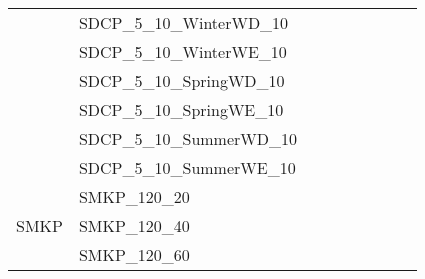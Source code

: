 \begin{table}[]
{\begin{tabular}{|c|l|l|l|l|l|l|l|l|}
			& SDCP\_5\_10\_WinterWD\_10     &                                    &                                  &                            &                          &                                         &                                 &                                \\
			& SDCP\_5\_10\_WinterWE\_10     &                                    &                                  &                            &                          &                                         &                                 &                                \\
			& SDCP\_5\_10\_SpringWD\_10     &                                    &                                  &                            &                          &                                         &                                 &                                \\
			& SDCP\_5\_10\_SpringWE\_10     &                                    &                                  &                            &                          &                                         &                                 &                                \\
			& SDCP\_5\_10\_SummerWD\_10     &                                    &                                  &                            &                          &                                         &                                 &                                \\
			& SDCP\_5\_10\_SummerWE\_10     &                                    &                                  &                            &                          &                                         &                                 &                                \\ \hline
			\multirow{5}{*}{SMKP}    & SMKP\_120\_20                 &                                    &                                  &                            &                          &                                         &                                 &                                \\
			& SMKP\_120\_40                 &                                    &                                  &                            &                          &                                         &                                 &                                \\
			& SMKP\_120\_60                 &                                    &                                  &                            &                          &                                         &                                 &                                \\

\end{tabular}}
\end{table}
